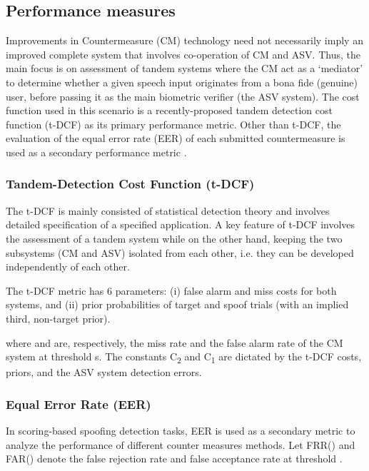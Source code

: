 \documentclass[a4paper]{article}
\begin{document}
\subsection{Performance measures}
    Improvements in Countermeasure (CM) technology need not necessarily imply an improved complete system that involves co-operation of CM and ASV. Thus, the main focus is on assessment of tandem systems where the CM act as a `mediator' to determine whether a given speech input originates from a bona fide (genuine) user, before passing it as the main biometric verifier (the ASV system). The cost function used in this scenario is a recently-proposed tandem detection cost function (t-DCF) \cite{tdcf} as its primary performance metric. Other than t-DCF, the evaluation of the equal error rate (EER) of each submitted countermeasure is used as a secondary performance metric \cite{evaluation}. 

\subsubsection{Tandem-Detection Cost Function (t-DCF)}
    The t-DCF \cite{tdcf} is mainly consisted of statistical detection theory and involves detailed specification of a specified application. A key feature of t-DCF involves the assessment of a tandem system while on the other hand, keeping the two subsystems (CM and ASV) isolated from each other, i.e. they can be developed independently of each other.
 
    The t-DCF metric has 6 parameters: (i) false alarm and miss costs for both systems, and (ii) prior probabilities of target and spoof trials (with an implied third, non-target prior).
    
    where  and  are, respectively, the miss rate and the false alarm rate of the CM system at threshold s. The constants C\textsubscript{2} and C\textsubscript{1} are dictated by the t-DCF costs, priors, and the ASV system detection errors.
    
\subsubsection{Equal Error Rate (EER)}
    
    In scoring-based spoofing detection tasks, EER is used as a secondary metric to analyze the performance of different counter measures methods. Let FRR() and FAR() denote the false rejection rate and false acceptance rate at threshold .

    
    
\end{document}
